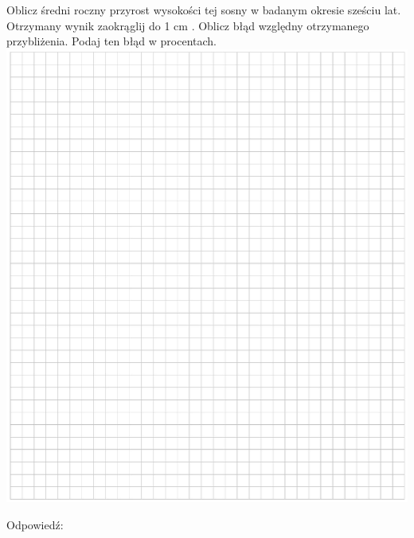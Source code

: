 \documentclass[10pt]{article}
\begin{document}
Oblicz średni roczny przyrost wysokości tej sosny w badanym okresie sześciu lat. Otrzymany wynik zaokrąglij do 1 cm . Oblicz błąd względny otrzymanego przybliżenia. Podaj ten błąd w procentach.\\
\includegraphics[max width=\textwidth, center]{2024_11_21_1c92fcc0db78c9202015g-12}

Odpowiedź:
\end{document}
